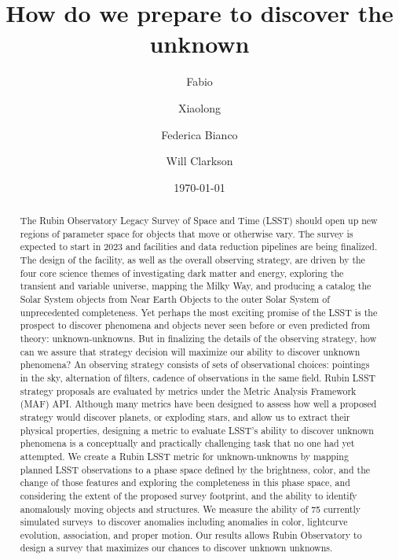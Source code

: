 \documentclass[onecolumn, 10pt]{aastex63}
\newcommand{\new}[1]{{\color{blue} #1}}
\newcommand{\question}[1]{{\color{red} #1}}
\begin{document}
\title{How do we prepare to discover the unknown}


\author{Fabio }

\author{Xiaolong }

\author{Federica Bianco}
\author{Will Clarkson}

\date{\today}

\begin{abstract}
The Rubin Observatory Legacy Survey of Space and Time
(LSST) should open up new regions of parameter space for objects that move or otherwise vary.
The survey is expected to start in 2023 and facilities and data reduction pipelines are being finalized. The design of the facility, as well as the overall observing strategy, are
driven by the four core science themes of investigating dark matter and energy, exploring the transient and variable universe, mapping the Milky Way, and producing a catalog the Solar System objects from Near Earth Objects to the outer Solar System of unprecedented completeness. Yet perhaps the most exciting promise of the LSST is the prospect to discover phenomena and objects never seen before or even predicted from theory: \question{unknown-unknowns}. But in finalizing the details of the observing strategy, how can we assure that strategy decision will maximize our ability to discover unknown phenomena?  An observing strategy consists of sets of observational choices: pointings in the sky, alternation of filters, cadence of observations in the same field. Rubin LSST strategy proposals are evaluated by metrics under the Metric Analysis Framework (MAF) API. Although many metrics have been designed to assess how well a proposed strategy would discover planets, or exploding stars, and allow us to extract their physical properties, designing a metric to evaluate LSST's ability to discover unknown phenomena is a conceptually and practically challenging task that no one had yet attempted.
We create a Rubin LSST metric for \question{unknown-unknowns} by mapping planned LSST observations to a phase space defined by the brightness, color, and the change of those features and exploring the completeness in this phase space, and considering the extent of the proposed survey footprint,  and the ability to identify anomalously moving objects and structures. We measure the ability of 75 currently simulated \new{surveys}~to discover anomalies  including anomalies in color, lightcurve evolution, association, and proper motion. Our results allows  Rubin Observatory to design a survey that maximizes our chances to discover unknown unknowns.
\end{abstract}
\end{document}
